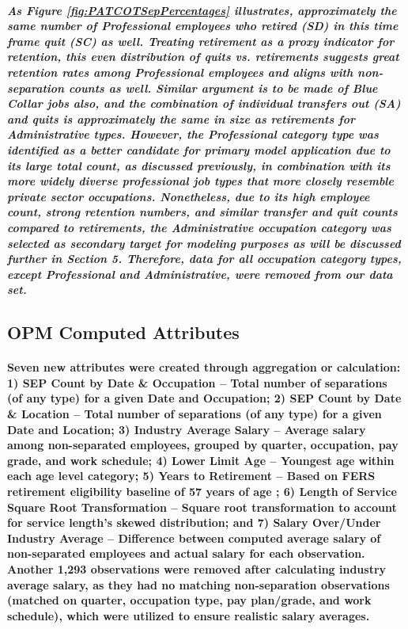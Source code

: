 \documentclass[10pt]{article}
\begin{document}
\subparagraph{As Figure \ref{fig:PATCOTSepPercentages} illustrates, approximately the same number of Professional employees who retired (SD) in this time frame quit (SC) as well. Treating retirement as a proxy indicator for retention, this even distribution of quits vs. retirements suggests great retention rates among Professional employees and aligns with non-separation counts as well. Similar argument is to be made of Blue Collar jobs also, and the combination of individual transfers out (SA) and quits is approximately the same in size as retirements for Administrative types. However, the Professional category type was identified as a better candidate for primary model application due to its large total count, as discussed previously, in combination with its more widely diverse professional job types that more closely resemble private sector occupations. Nonetheless, due to its high employee count, strong retention numbers, and similar transfer and quit counts compared to retirements, the Administrative occupation category was selected as secondary target for modeling purposes as will be discussed further in Section 5. Therefore, data for all occupation category types, except Professional and Administrative, were removed from our data set.} 
 
 
\subsection{OPM Computed Attributes}

\paragraph{Seven new attributes were created through aggregation or calculation: 1) SEP Count by Date \& Occupation – Total number of separations (of any type) for a given Date and Occupation; 2) SEP Count by Date \& Location – Total number of separations (of any type) for a given Date and Location; 3) Industry Average Salary – Average salary among non-separated employees, grouped by quarter, occupation, pay grade, and work schedule; 4) Lower Limit Age – Youngest age within each age level category; 5) Years to Retirement – Based on FERS retirement eligibility baseline of 57 years of age \cite{bls}; 6) Length of Service Square Root Transformation – Square root transformation to account for service length's skewed distribution; and 7) Salary Over/Under Industry Average – Difference between computed average salary of non-separated employees and actual salary for each observation. Another 1,293 observations were removed after calculating industry average salary, as they had no matching non-separation observations (matched on quarter, occupation type, pay plan/grade, and work schedule), which were utilized to ensure realistic salary averages.}
 
\end{document}

